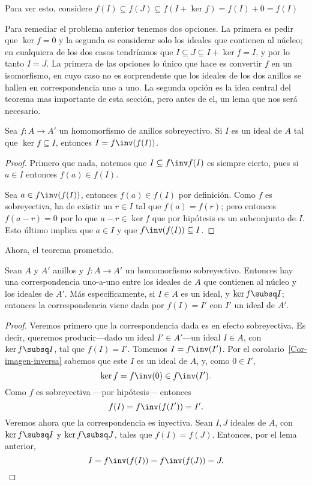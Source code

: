 \begin{nota}
	Para ver esto, considere $f(I) \subseteq f(J) \subseteq f(I + \ker f) = f(I) + 0 = f(I)$
\end{nota}
Para remediar el problema anterior tenemos dos opciones. La primera es pedir que $\ker f = 0$ y la segunda es considerar solo los ideales que contienen al núcleo; en cualquiera de los dos casos tendríamos que $I \subseteq J \subseteq I + \ker f = I$, y por lo tanto $I=J$. La primera de las opciones lo único que hace es convertir $f$ en un isomorfismo, en cuyo caso no es sorprendente que los ideales de los dos anillos se hallen en correspondencia uno a uno. La segunda opción es la idea central del teorema mas importante de esta sección, pero antes de el, un lema que nos será necesario.
\begin{lem}
	Sea $f\colon A\to A'$ un homomorfismo de anillos sobreyectivo. Si $I$ es un ideal de $A$ tal que $\ker  f \subseteq I$, entonces $I = f\inv(f(I))$.
\end{lem} 
\begin{proof}
	Primero que nada, notemos que $I\subseteq f\inv f(I)$ es siempre cierto, pues si $a\in I$ entonces $f(a)\in f(I)$.
	
	Sea $a\in f\inv (f(I))$, entonces $f(a)\in f(I)$ por definición. Como $f$ es sobreyectiva, ha de existir un $r\in I$ tal que $f(a) = f(r)$; pero entonces $f(a-r) = 0$ por lo que $a-r\in \ker f$ que por hipótesis es un subconjunto de $I$. Esto último implica que $a\in I$ y que $f\inv (f(I)) \subseteq I$.
\end{proof}
Ahora, el teorema prometido.
\begin{teo}[de correspondencia]
	Sean $A$ y $A'$ anillos y $f\colon A\to A'$ un homomorfismo sobreyectivo. Entonces hay una correspondencia uno-a-uno entre los ideales de $A$ que contienen al núcleo y los ideales de $A'$. Más específicamente, si $I\in A$ es un ideal, y $\ker f \subsq I$; entonces la correspondencia viene dada por $f(I) = I'$ con $I'$ un ideal de $A'$. 
\end{teo}
\begin{proof}
	Veremos primero que la correspondencia dada es en efecto sobreyectiva. Es decir, queremos producir---dado un ideal $I'\in A'$---un ideal $I\in A$, con $\ker f \subsq I$, tal que $f(I) = I'$. Tomemos $I = f\inv(I')$. Por el corolario~\ref{Cor-imagen-inversa} sabemos que este $I$ es un ideal de $A$, y, como $0\in I'$,
	\[ \ker f = f\inv (0) \in f\inv(I'). \]
	Como $f$ es sobreyectiva ---por hipótesis--- entonces 
	\[f(I) = f\inv(f(I')) = I'.\]
	Veremos ahora que la correspondencia es inyectiva. Sean $I,J$ ideales de $A$, con $\ker f \subsq I$ y $\ker f \subsq J$, tales que $f(I) = f(J)$. Entonces, por el lema anterior,
	\[ I = f\inv (f(I)) = f\inv (f(J)) = J.\]
\end{proof}
